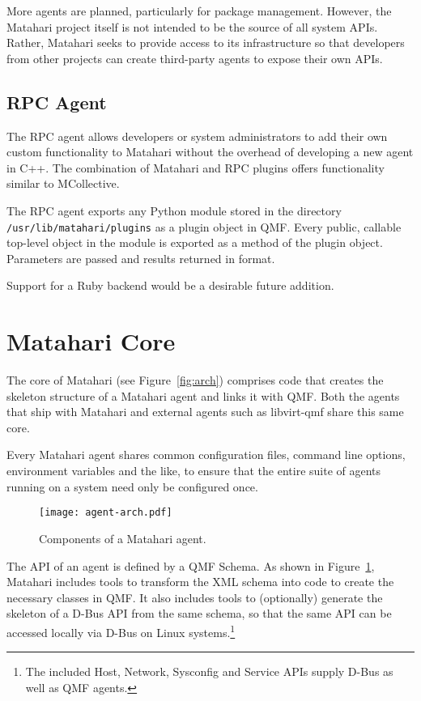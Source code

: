 \documentclass{tufte-handout}
\begin{document}
More agents are planned, particularly for package management.
However, the Matahari project itself is not intended to be the source of all system APIs. Rather, Matahari seeks to provide access to its infrastructure so that developers from other projects can create third-party agents to expose their own APIs.

\subsection{RPC Agent}

The RPC agent allows developers or system administrators to add their own custom functionality to Matahari without the overhead of developing a new agent in C++. The combination of Matahari and RPC plugins offers functionality similar to MCollective.

The RPC agent exports any Python module stored in the directory \Verb|/usr/lib/matahari/plugins| as a plugin object in QMF. Every public, callable top-level object in the module is exported as a method of the plugin object. Parameters are passed and results returned in  format.

Support for a Ruby backend would be a desirable future addition.

\section{Matahari Core}

The core of Matahari (see Figure~\ref{fig:arch}) comprises code that creates the skeleton structure of a Matahari agent and links it with QMF. Both the agents that ship with Matahari and external agents such as libvirt-qmf share this same core.

Every Matahari agent shares common configuration files, command line options, environment variables and the like, to ensure that the entire suite of agents running on a system need only be configured once.

\begin{figure}[hbt]
\texttt{[image: agent-arch.pdf]}
\caption{Components of a Matahari agent.}
\label{fig:agent-arch}
\end{figure}

The API of an agent is defined by a QMF Schema. As shown in Figure~\ref{fig:agent-arch}, Matahari includes tools to transform the XML schema into code to create the necessary classes in QMF.
It also includes tools to (optionally) generate the skeleton of a D-Bus API from the same schema, so that the same API can be accessed locally via D-Bus on Linux systems.\footnote{The included Host, Network, Sysconfig and Service APIs supply D-Bus as well as QMF agents.}
\end{document}
